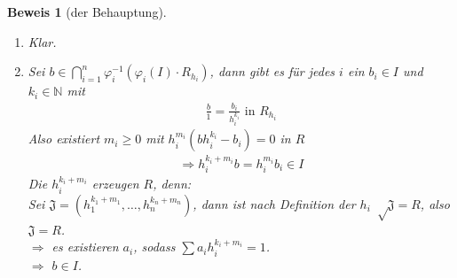 \documentclass[a4paper,oneside]{scrbook}
\theoremstyle{break}
\theoremstyle{nonumberbreak}
\theoremstyle{nonumberplain}
\newtheorem{Bew}{Beweis}
\theoremstyle{break}
\begin{document}
\begin{Bew}[der Behauptung]
  \begin{enumerate}
  \item[``$\subseteq$''] Klar.
  \item[``$\supseteq$''] Sei $b\in\bigcap_{i=1}^n\varphi_i^{-1}(\varphi_i(I)\cdot R_{h_i})$, 
    dann gibt es für jedes $i$ ein $b_i\in I$ und $k_i\in\mathbb N$ mit
    \begin{align*}
      \frac{b}{1}=\frac{b_i}{h_i^{k_i}}\text{ in } R_{h_i}
    \end{align*}
    Also existiert $m_i\geq 0$ mit $h_i^{m_i}(bh_i^{k_i}-b_i)=0$ in $R$
    \begin{align*}
      \Rightarrow h_i^{k_i+m_i}b=h_i^{m_i}b_i\in I
    \end{align*}
    Die $h_i^{k_i+m_i}$ erzeugen $R$, denn: \\
    Sei $\mathfrak J=(h_1^{k_1+m_1},\dots,h_n^{k_n+m_n})$, dann ist nach Definition der $h_i$ $\sqrt\mathfrak J=R$, also $\mathfrak J=R$. \\
    $\Rightarrow$ es existieren $a_i$, sodass $\sum a_ih_i^{k_i+m_i}=1$. \\
    $\Rightarrow$ $b\in I$.
  \end{enumerate}
\end{Bew}
\appendix

\def\indexspace{\par\medskip}
\end{document}
